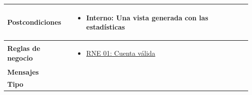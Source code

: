 \begin{center}
\begin{longtable}{| p{3.5cm} | p{11.5cm} |}
        \hline  
          \textbf{Postcondiciones} & 
              \begin{itemize}
                \item \textbf{Interno:} Una vista generada con las estadísticas
              \end{itemize} \\
        \hline
          \textbf{Reglas de negocio} & 
              \begin{itemize}
                 \item {\hyperref[rnr_01]{RNE 01: Cuenta válida}}
              \end{itemize} \\
        \hline
          \textbf{Mensajes} & \\
        \hline
          \textbf{Tipo} & \\
        \hline      
  \end{longtable}
\end{center}
\endgroup

